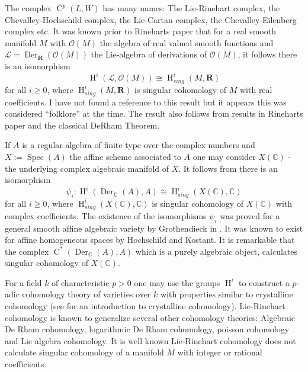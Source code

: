 \documentclass{amsart}
\theoremstyle{plain}
\theoremstyle{definition}
\theoremstyle{remark}
\numberwithin{equation}{theorem}
\begin{document}
The complex ${\operatorname{C} }^p(L,W)$ has many names: The Lie-Rinehart complex, the Chevalley-Hochschild
complex, the Lie-Cartan complex, the Chevalley-Eilenberg complex etc. It was known prior to Rineharts paper \cite{rinehart}
that for a real smooth manifold $M$ with ${\mathcal{O} }(M)$ the algebra of real valued smooth functions and 
$\mathcal{L}={\operatorname{Der} }_{\mathbf{R}}({\mathcal{O} }(M))$ the Lie-algebra of derivations of ${\mathcal{O} }(M)$, it follows there is an isomorphism
\[ {\operatorname{H} }^i(\mathcal{L},{\mathcal{O} }(M)) \cong {\operatorname{H} }^i_{sing}(M,\mathbf{R}) \]
for all $i\geq 0$, where ${\operatorname{H} }^i_{sing}(M,\mathbf{R})$ is singular cohomology of $M$ with real coefficients.
I have not found a reference to this result but it appears this was considered ``folklore'' at the time.
The result also follows from results in Rineharts paper \cite{rinehart} and the classical DeRham Theorem.

If $A$ is a regular algebra of finite type over the complex numbers and $X:={\operatorname{Spec} }(A)$ the affine scheme associated 
to $A$ one may consider $X({\mathbb{C} })$ - the underlying complex algebraic manifold of $X$. It follows from \cite{grothendieck}
there is an isomorphism
\[ \psi_i:{\operatorname{H} }^i({\operatorname{Der} }_{\mathbb{C} }(A),A)\cong {\operatorname{H} }^i_{sing}(X({\mathbb{C} }),{\mathbb{C} }) \]
for all $i\geq 0$, 
where ${\operatorname{H} }^i_{sing}(X({\mathbb{C} }),{\mathbb{C} })$ is singular cohomology of $X({\mathbb{C} })$ with complex coefficients. The existence of the 
isomorphisms $\psi_i$ 
was proved for a general smooth affine algebraic variety by Grothendieck in \cite{grothendieck}. It was known
to exist for affine homogeneous spaces by Hochschild and Kostant. It is remarkable that the complex ${\operatorname{C} }^*({\operatorname{Der} }_{\mathbb{C} }(A),A)$
which is a purely algebraic object, calculates singular cohomology of $X({\mathbb{C} })$. 

For a field $k$ of characteristic $p>0$ one may use the groups ${\operatorname{H} }^i$ to construct a $p$-adic cohomology
theory of varieties over $k$  with properties similar to crystalline cohomology 
(see \cite{berthelot} for an introduction to crystalline cohomology). Lie-Rinehart cohomology
is known to generalize several other cohomology theories: Algebraic De Rham cohomology, 
logarithmic De Rham cohomology, poisson cohomology and  Lie algebra cohomology.
It is well known Lie-Rinehart cohomology does not calculate singular cohomology of a 
manifold $M$ with integer or rational coefficients. 
\end{document}

